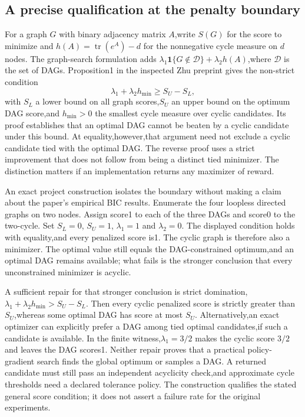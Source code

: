 \subsection{A precise qualification at the penalty boundary}
For a graph $G$ with binary adjacency matrix $A$,write $S(G)$ for the score to minimize and
$h(A)=\operatorname{tr}(e^A)-d$ for the nonnegative cycle measure on $d$ nodes. The graph-search
formulation adds $\lambda_1\mathbf{1}\{G\notin\mathcal D\}+\lambda_2h(A)$,where $\mathcal D$
is the set of DAGs. Proposition1 in the inspected Zhu preprint gives the non-strict condition
\[
 \lambda_1+\lambda_2h_{\min}\geq S_U-S_L,
\]
with $S_L$ a lower bound on all graph scores,$S_U$ an upper bound on the optimum DAG score,and
$h_{\min}>0$ the smallest cycle measure over cyclic candidates. Its proof establishes that an
optimal DAG cannot be beaten by a cyclic candidate under this bound. At equality,however,that
argument need not exclude a cyclic candidate tied with the optimal DAG. The reverse proof uses
a strict improvement that does not follow from being a distinct tied minimizer. The distinction
matters if an implementation returns any maximizer of reward.~\citep{exec28_rl_zhu}

An exact project construction isolates the boundary without making a claim about the paper's
empirical BIC results. Enumerate the four loopless directed graphs on two nodes. Assign score1
to each of the three DAGs and score0 to the two-cycle. Set $S_L=0$, $S_U=1$,
$\lambda_1=1$ and $\lambda_2=0$. The displayed condition holds with equality,and every penalized
score is1. The cyclic graph is therefore also a minimizer. The optimal value still equals the
DAG-constrained optimum,and an optimal DAG remains available; what fails is the stronger
conclusion that every unconstrained minimizer is acyclic.~\citep{exec28_rl_reference}

A sufficient repair for that stronger conclusion is strict domination,
$\lambda_1+\lambda_2h_{\min}>S_U-S_L$. Then every cyclic penalized score is strictly greater
than $S_U$,whereas some optimal DAG has score at most $S_U$. Alternatively,an exact optimizer
can explicitly prefer a DAG among tied optimal candidates,if such a candidate is available.
In the finite witness,$\lambda_1=3/2$ makes the cyclic score $3/2$ and leaves the DAG scores1.
Neither repair proves that a practical policy-gradient search finds the global optimum or samples
a DAG. A returned candidate must still pass an independent acyclicity check,and approximate
cycle thresholds need a declared tolerance policy. The construction qualifies the stated general
score condition; it does not assert a failure rate for the original experiments.
\citep{exec28_rl_reference}

